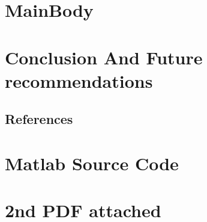 \documentclass[english]{book}
\begin{document}
\mainmatter
\chapter{MainBody}


\newpage
\backmatter
\chapter*{Conclusion And Future recommendations}

\section*{References}
\printbibliography[heading=none] %

\appendix
\chapter{Matlab Source Code}

\chapter{2nd PDF attached}
\end{document}
